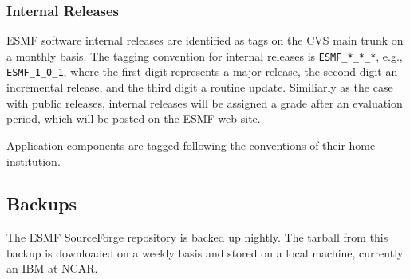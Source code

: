 \subsubsection{Internal Releases}
ESMF software internal releases are identified as tags on the CVS main trunk on a monthly basis.
The tagging convention for internal releases is
{\tt ESMF\_*\_*\_*}, e.g., {\tt ESMF\_1\_0\_1}, where the first digit represents a 
major release, the second digit an incremental release, and the third digit a routine update.
Similiarly as the case with public releases, internal releases will be assigned a grade
after an evaluation period, which will be posted on the ESMF web site.

Application components are tagged following the conventions of their
home institution.

\subsection{Backups}

The ESMF SourceForge repository is backed up nightly.  The tarball
from this backup is downloaded on a weekly basis and stored on a local
machine, currently an IBM at NCAR.  









